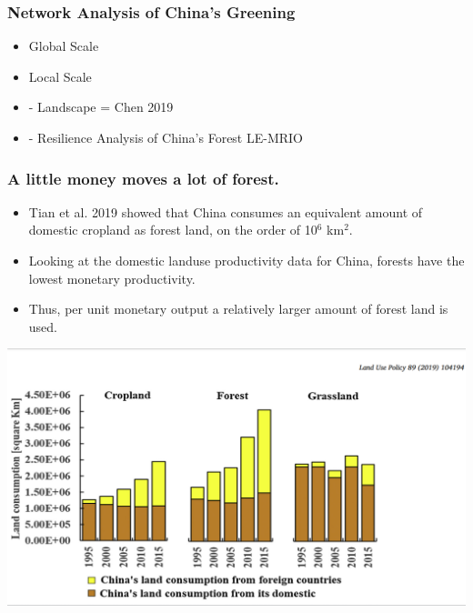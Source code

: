 \documentclass{beamer}
\begin{document}
\begin{frame}
  \frametitle{Network Analysis of China's Greening}

  \begin{itemize}
  \item Global Scale
  \item Local Scale
  \item  - Landscape = Chen 2019
  \item  - Resilience Analysis of China's Forest LE-MRIO
  \end{itemize}

\end{frame}

\begin{frame}
  \frametitle{A little money moves a lot of forest. }

  \begin{itemize}
  \item Tian et al. 2019 showed that China consumes an equivalent amount
    of domestic cropland as forest land, on the order of 10$^6$ km$^2$.
  \item Looking at the domestic landuse productivity data for China,
    forests have the lowest monetary productivity.
  \item Thus, per unit monetary output a relatively larger amount of
    forest land is used.
  \end{itemize}

\begin{center}\includegraphics[width=0.5\linewidth]{images/Tian_2019_Fig1} \end{center}

\end{frame}
\end{document}

